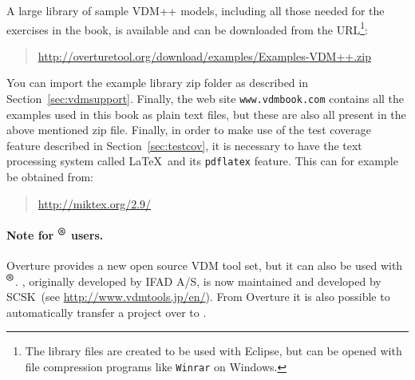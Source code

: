 \begin{description}
\end{description}
%
A large library of sample VDM++ models, including all those needed for the exercises in the book, is available and can be downloaded from the URL\footnote{The library files are created to be used with Eclipse, but can be opened with file compression programs like \texttt{Winrar} on Windows.}:
%
\begin{quote}
\url{http://overturetool.org/download/examples/Examples-VDM++.zip}
\end{quote}
%
You can import the example library zip folder as described in Section~\ref{sec:vdmsupport}.  Finally, the web site \texttt{www.vdmbook.com} contains all the examples used in this book as plain text files, but these are also all present in the above mentioned zip file. Finally, in order to make use of the test coverage feature described in Section~\ref{sec:testcov}, it is
necessary to have the text processing system called \LaTeX\ and its \texttt{pdflatex} feature. This can for example be obtained from:
%
\begin{quote}
\url{http://miktex.org/2.9/}
\end{quote}
%
\paragraph{Note for \vdmtools$^{\mbox{\small\textbf{{\textregistered}}}}$ users.}
Overture provides a new open source VDM tool set, but it can also be used with \vdmtools$^{\mbox{\small\textbf{{\textregistered}}}}$. \vdmtools, originally developed by IFAD A/S, is now maintained and developed by SCSK~(see \url{http://www.vdmtools.jp/en/}). From Overture it is also possible to automatically transfer a project over to \vdmtools.


